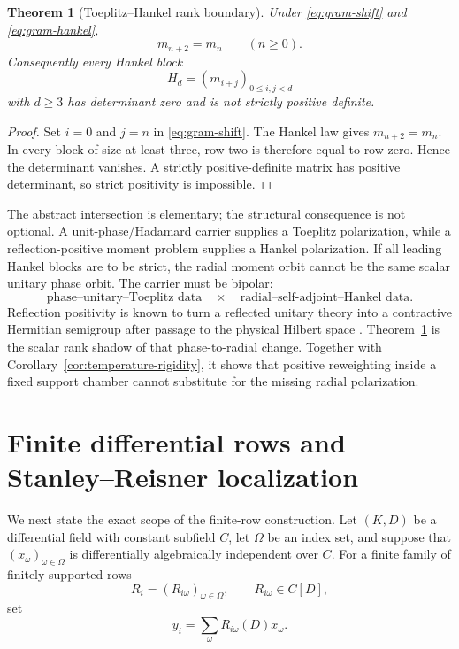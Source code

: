 \documentclass[11pt]{article}
\newtheorem{theorem}{Theorem}[section]
\theoremstyle{definition}
\theoremstyle{remark}
\begin{document}
\begin{theorem}[Toeplitz--Hankel rank boundary]
\label{thm:toeplitz-hankel}
Under \eqref{eq:gram-shift} and \eqref{eq:gram-hankel},
\[
  m_{n+2}=m_n\qquad(n\geq0).
\]
Consequently every Hankel block
\[
  H_d=(m_{i+j})_{0\leq i,j<d}
\]
with \(d\geq3\) has determinant zero and is not strictly positive definite.
\end{theorem}

\begin{proof}
Set \(i=0\) and \(j=n\) in \eqref{eq:gram-shift}.  The Hankel law gives
\(m_{n+2}=m_n\).  In every block of size at least three, row two is therefore equal to row
zero.  Hence the determinant vanishes.  A strictly positive-definite matrix has positive
determinant, so strict positivity is impossible.
\end{proof}

The abstract intersection is elementary; the structural consequence is not optional.  A
unit-phase/Hadamard carrier supplies a Toeplitz polarization, while a reflection-positive
moment problem supplies a Hankel polarization.  If all leading Hankel blocks are to be strict,
the radial moment orbit cannot be the same scalar unitary phase orbit.  The carrier must be
bipolar:
\[
  \text{phase--unitary--Toeplitz data}
  \quad\times\quad
  \text{radial--self-adjoint--Hankel data}.
\]
Reflection positivity is known to turn a reflected unitary theory into a contractive Hermitian
semigroup after passage to the physical Hilbert space
\cite{NeebOlafsson2013,AdamoNeebSchober2021}.  Theorem~\ref{thm:toeplitz-hankel} is the scalar
rank shadow of that phase-to-radial change.  Together with
Corollary~\ref{cor:temperature-rigidity}, it shows that positive reweighting inside a fixed
support chamber cannot substitute for the missing radial polarization.

\section{Finite differential rows and Stanley--Reisner localization}
\label{sec:rows}

We next state the exact scope of the finite-row construction.  Let \((K,D)\) be a differential
field with constant subfield \(C\), let \(\Omega\) be an index set, and suppose that
\((x_\omega)_{\omega\in\Omega}\) is differentially algebraically independent over \(C\).
For a finite family of finitely supported rows
\[
  R_i=(R_{i\omega})_{\omega\in\Omega},
  \qquad R_{i\omega}\in C[D],
\]
set
\[
  y_i=\sum_{\omega}R_{i\omega}(D)x_\omega.
\]
\end{document}
